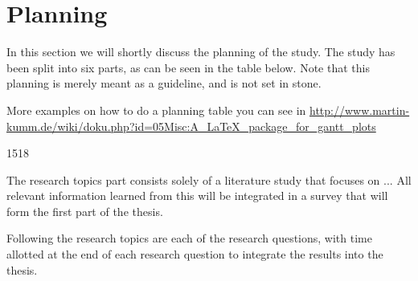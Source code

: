 \section{Planning}


In this section we will shortly discuss the planning of the study. The study has been split into six parts, as can be seen in the table below. Note that this planning is merely meant as a guideline, and is not set in stone.

More examples on how to do a planning table you can see in \url{http://www.martin-kumm.de/wiki/doku.php?id=05Misc:A_LaTeX_package_for_gantt_plots}

\begin{figure*}[t!]
	\centering
	\begin{gantt}[xunitlength=0.5cm,fontsize=\small,titlefontsize=\small,drawledgerline=true]{15}{18} %
		
		\begin{ganttitle} %
		\end{ganttitle}
		
		\begin{ganttitle} %
		\end{ganttitle}
		
		\begin{ganttitle} %
		\end{ganttitle}
		
		
		
		
		
		
		\addtocounter{ganttnum}{1}
		\addtocounter{ganttnum}{1}
		\addtocounter{ganttnum}{1}
		\addtocounter{ganttnum}{1}
		\addtocounter{ganttnum}{1}
		
	\end{gantt}	
\end{figure*}


The research topics part consists solely of a literature study that focuses on ... All relevant information learned from this will be integrated in a survey that will form the first part of the thesis.

Following the research topics are each of the research questions, with time allotted at the end of each research question to integrate the results into the thesis. 